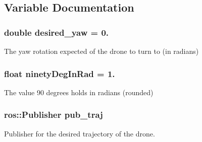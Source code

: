 \subsection{Variable Documentation}
\subsubsection[{\texorpdfstring{desired\+\_\+yaw}{desired_yaw}}]{\setlength{\rightskip}{0pt plus 5cm}double desired\+\_\+yaw = 0.}\hypertarget{oculus-control-alternative_8cpp_a03a69ef33d756512293e67791ab5f265}{}\label{oculus-control-alternative_8cpp_a03a69ef33d756512293e67791ab5f265}


The yaw rotation expected of the drone to turn to (in radians) 

\subsubsection[{\texorpdfstring{ninety\+Deg\+In\+Rad}{ninetyDegInRad}}]{\setlength{\rightskip}{0pt plus 5cm}float ninety\+Deg\+In\+Rad = 1.}\hypertarget{oculus-control-alternative_8cpp_a2cce9b626fdb3b1f78baad955bd5b609}{}\label{oculus-control-alternative_8cpp_a2cce9b626fdb3b1f78baad955bd5b609}


The value 90 degrees holds in radians (rounded) 

\subsubsection[{\texorpdfstring{pub\+\_\+traj}{pub_traj}}]{\setlength{\rightskip}{0pt plus 5cm}ros\+::\+Publisher pub\+\_\+traj}\hypertarget{oculus-control-alternative_8cpp_a92b67ae724bc0d23b8e85e92e89403df}{}\label{oculus-control-alternative_8cpp_a92b67ae724bc0d23b8e85e92e89403df}


Publisher for the desired trajectory of the drone. 


